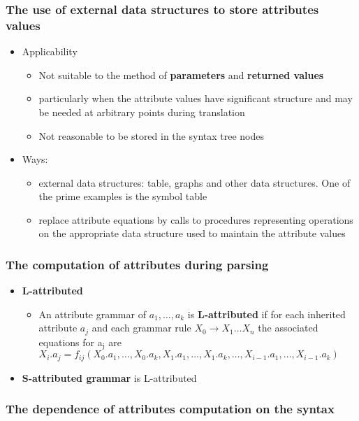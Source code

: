 \documentclass[11pt]{article}
\begin{document}
\subsubsection{The use of external data structures to store attributes values}
\label{sec:orgb222566}
\begin{itemize}
\item Applicability
\begin{itemize}
\item Not suitable to the method of \textbf{parameters} and \textbf{returned values}
\item particularly when the attribute values have significant structure
and may be needed at arbitrary points during translation
\item Not reasonable to be stored in the syntax tree nodes
\end{itemize}
\item Ways:
\begin{itemize}
\item external data structures: table, graphs and other data structures. One
of the prime examples is the symbol table
\item replace attribute equations by calls to procedures representing
operations on the appropriate data structure used to maintain the
attribute values
\end{itemize}
\end{itemize}
\subsubsection{The computation of attributes during parsing}
\label{sec:org3bad817}
\begin{itemize}
\item \textbf{L-attributed}
\begin{itemize}
\item An attribute grammar of \(a_1,\dots,a_k\) is \textbf{L-attributed} if for each
inherited attribute \(a_j\) and each grammar rule \(X_0\to X_1\dots X_n\)
the associated equations for a\(_{\text{j}}\) are
\(X_i.a_j=f_{ij}(X_0.a_1,\dots,X_0.a_k,X_1.a_1,\dots,X_1.a_k,\dots,X_{i-1}
        .a_1,\dots,X_{i-1}.a_k)\)
\end{itemize}
\item \textbf{S-attributed grammar} is L-attributed
\end{itemize}
\subsubsection{The dependence of attributes computation on the syntax}
\label{sec:org2f0fa84}
\end{document}
